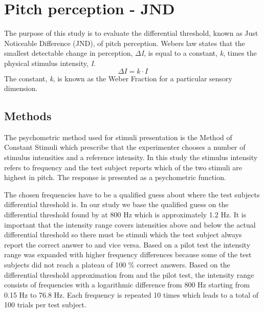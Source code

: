 \chapter*{Pitch perception - JND}
%
The purpose of this study is to evaluate the differential threshold, known as Just Noticeable Difference (JND), of pitch perception. Webers law states that the smallest detectable change in perception, \textit{$\Delta$I}, is equal to a constant, \textit{k}, times the physical stimulus intensity, \textit{I}. 
%
\begin{equation}
\Delta I = k \cdot I
\end{equation}
%
The constant, \textit{k}, is known as the Weber Fraction for a particular sensory dimension.
%

\section*{Methods}
%
The psychometric method used for stimuli presentation is the Method of Constant Stimuli which prescribe that the experimenter chooses a number of stimulus intensities and a reference intensity. In this study the stimulus intensity refers to frequency and the test subject reports which of the two stimuli are highest in pitch. The response is presented as a psychometric function. 

The chosen frequencies have to be a qualified guess about where the test subjects differential threshold is. In our study we base the qualified guess on the differential threshold found by \citet{Wier1977} at 800 Hz which is approximately 1.2 Hz. It is important that the intensity range covers intensities above and below the actual differential threshold so there must be stimuli which the test subject always report the correct answer to and vice versa. Based on a pilot test the intensity range was expanded with higher frequency differences because some of the test subjects did not reach a plateau of 100 \% correct answers. Based on the differential threshold approximation from \citet{Wier1977} and the pilot test, the intensity range consists of frequencies with a logarithmic difference from 800 Hz starting from 0.15 Hz to 76.8 Hz. Each frequency is repeated 10 times which leads to a total of 100 trials per test subject.  


